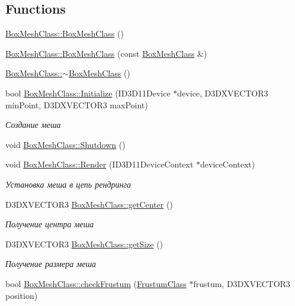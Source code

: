 \subsection*{Functions}
\begin{DoxyCompactItemize}
\item 
\hyperlink{group___meshes_gabc9d6020c66652ae6e3242ec85ae4663}{Box\+Mesh\+Class\+::\+Box\+Mesh\+Class} ()
\item 
\hyperlink{group___meshes_ga92cfbdfdf9c487040a8dab0f9a2974a1}{Box\+Mesh\+Class\+::\+Box\+Mesh\+Class} (const \hyperlink{class_box_mesh_class}{Box\+Mesh\+Class} \&)
\item 
\hyperlink{group___meshes_ga610c8c0a85ea53728654d748336404e5}{Box\+Mesh\+Class\+::$\sim$\+Box\+Mesh\+Class} ()
\item 
bool \hyperlink{group___meshes_gafb74aab48557e9c4e0ecc532b87b9a5c}{Box\+Mesh\+Class\+::\+Initialize} (I\+D3\+D11\+Device $\ast$device, D3\+D\+X\+V\+E\+C\+T\+O\+R3 min\+Point, D3\+D\+X\+V\+E\+C\+T\+O\+R3 max\+Point)
\begin{DoxyCompactList}\small\item\em Создание меша \end{DoxyCompactList}\item 
void \hyperlink{group___meshes_ga93bf13a26ba0fce8444d818e89c04508}{Box\+Mesh\+Class\+::\+Shutdown} ()
\item 
void \hyperlink{group___meshes_ga166a0bcded8a30e29d84b924bb94512f}{Box\+Mesh\+Class\+::\+Render} (I\+D3\+D11\+Device\+Context $\ast$device\+Context)
\begin{DoxyCompactList}\small\item\em Установка меша в цепь рендринга \end{DoxyCompactList}\item 
D3\+D\+X\+V\+E\+C\+T\+O\+R3 \hyperlink{group___meshes_ga178f792d827e1853667fdf7936329eaf}{Box\+Mesh\+Class\+::get\+Center} ()
\begin{DoxyCompactList}\small\item\em Получение центра меша \end{DoxyCompactList}\item 
D3\+D\+X\+V\+E\+C\+T\+O\+R3 \hyperlink{group___meshes_ga50bc67b50cc0a3c7a38d2893c5fae07e}{Box\+Mesh\+Class\+::get\+Size} ()
\begin{DoxyCompactList}\small\item\em Получение размера меша \end{DoxyCompactList}\item 
bool \hyperlink{group___meshes_gac780e22baf0b7e6683121ded18a40b76}{Box\+Mesh\+Class\+::check\+Frustum} (\hyperlink{class_frustum_class}{Frustum\+Class} $\ast$frustum, D3\+D\+X\+V\+E\+C\+T\+O\+R3 position)

\end{DoxyCompactItemize}
